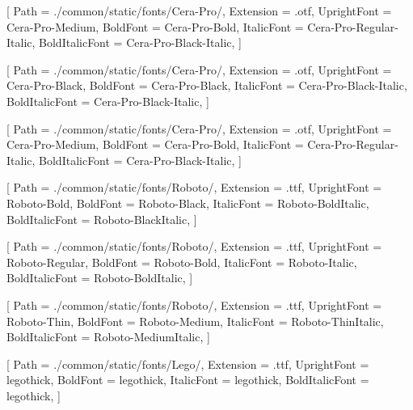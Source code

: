 
\contourlength{0.8pt}

\renewcommand{\ULdepth}{3.8pt}

\setmainfont{Cera-Pro-Medium}[
Path = ./common/static/fonts/Cera-Pro/,
Extension = .otf,
UprightFont = Cera-Pro-Medium,
BoldFont = Cera-Pro-Bold,
ItalicFont = Cera-Pro-Regular-Italic,
BoldItalicFont = Cera-Pro-Black-Italic,
]


[
Path = ./common/static/fonts/Cera-Pro/,
Extension = .otf,
UprightFont = Cera-Pro-Black,
BoldFont = Cera-Pro-Black,
ItalicFont = Cera-Pro-Black-Italic,
BoldItalicFont = Cera-Pro-Black-Italic,
]

[
Path = ./common/static/fonts/Cera-Pro/,
Extension = .otf,
UprightFont = Cera-Pro-Medium,
BoldFont = Cera-Pro-Bold,
ItalicFont = Cera-Pro-Regular-Italic,
BoldItalicFont = Cera-Pro-Black-Italic,
]

[
Path = ./common/static/fonts/Roboto/,
Extension = .ttf,
UprightFont = Roboto-Bold,
BoldFont = Roboto-Black,
ItalicFont = Roboto-BoldItalic,
BoldItalicFont = Roboto-BlackItalic,
]

[
Path = ./common/static/fonts/Roboto/,
Extension = .ttf,
UprightFont = Roboto-Regular,
BoldFont = Roboto-Bold,
ItalicFont = Roboto-Italic,
BoldItalicFont = Roboto-BoldItalic,
]

[
Path = ./common/static/fonts/Roboto/,
Extension = .ttf,
UprightFont = Roboto-Thin,
BoldFont = Roboto-Medium,
ItalicFont = Roboto-ThinItalic,
BoldItalicFont = Roboto-MediumItalic,
]

[
Path = ./common/static/fonts/Lego/,
Extension = .ttf,
UprightFont = legothick,
BoldFont = legothick,
ItalicFont = legothick,
BoldItalicFont = legothick,
]